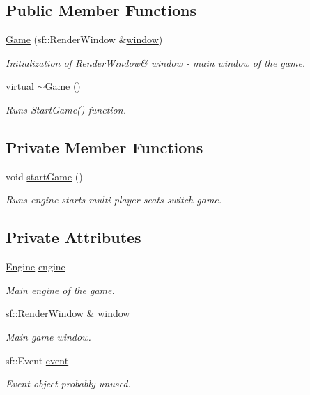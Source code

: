 \subsection*{Public Member Functions}
\begin{DoxyCompactItemize}
\item 
\hyperlink{class_game_af4259d9962bf0998d01c6e594eca2f58}{Game} (sf\+::\+Render\+Window \&\hyperlink{class_game_ad0fb4d8653dcf289fd6573cf5ba0f3d1}{window})
\begin{DoxyCompactList}\small\item\em Initialization of Render\+Window\& window -\/ main window of the game. \end{DoxyCompactList}\item 
virtual \hyperlink{class_game_ae3d112ca6e0e55150d2fdbc704474530}{$\sim$\+Game} ()
\begin{DoxyCompactList}\small\item\em Runs Start\+Game() function. \end{DoxyCompactList}\end{DoxyCompactItemize}
\subsection*{Private Member Functions}
\begin{DoxyCompactItemize}
\item 
void \hyperlink{class_game_ae8638ccdb0ef3bf39a6affa30aa1258f}{start\+Game} ()
\begin{DoxyCompactList}\small\item\em Runs engine starts multi player seats switch game. \end{DoxyCompactList}\end{DoxyCompactItemize}
\subsection*{Private Attributes}
\begin{DoxyCompactItemize}
\item 
\hyperlink{class_engine}{Engine} \hyperlink{class_game_ad407022fcdd5ece2ccb8ae9ab6558a73}{engine}
\begin{DoxyCompactList}\small\item\em Main engine of the game. \end{DoxyCompactList}\item 
sf\+::\+Render\+Window \& \hyperlink{class_game_ad0fb4d8653dcf289fd6573cf5ba0f3d1}{window}
\begin{DoxyCompactList}\small\item\em Main game window. \end{DoxyCompactList}\item 
sf\+::\+Event \hyperlink{class_game_a399e6ac5b37307b16dc9f769e0b538c9}{event}
\begin{DoxyCompactList}\small\item\em Event object probably unused. \end{DoxyCompactList}\end{DoxyCompactItemize}


